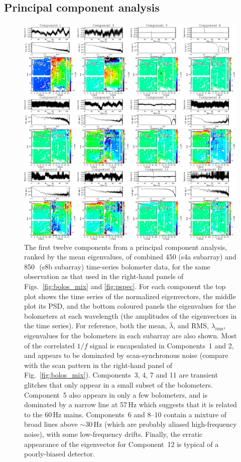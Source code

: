 \documentclass[useAMS,usenatbib,nofootinbib]{mn2e}
\newcommand{\rms}{RMS}
\begin{document}
\subsection{Principal component analysis}
\label{sec:pca}

\begin{figure}
\centering
\includegraphics[width=\linewidth]{pca.pdf}
\caption{The first twelve components from a principal component
  analysis, ranked by the mean eigenvalues, of combined 450 (s4a
  subarray) and 850\,\micron\ (s8b subarray) time-series bolometer
  data, for the same observation as that used in the right-hand panels
  of Figs.~\ref{fig:bolos_mix} and \ref{fig:pspec}. For each component
  the top plot shows the time series of the normalized eigenvectors,
  the middle plot its PSD, and the bottom coloured panels the
  eigenvalues for the bolometers at each wavelength (the amplitudes of
  the eigenvectors in the time series). For reference, both the mean,
  $\bar{\lambda}$, and \rms, $\lambda_\mathrm{rms}$, eigenvalues for
  the bolometers in each subarray are also shown. Most of the
  correlated $1/f$ signal is encapsulated in Components~1 and 2, and
  appears to be dominated by scan-synchronous noise (compare with the
  scan pattern in the right-hand panel of Fig.~\ref{fig:bolos_mix}).
  Components~3, 4, 7 and 11 are transient glitches that only appear in
  a small subset of the bolometers. Component~5 also appears in only a
  few bolometers, and is dominated by a narrow line at 57\,Hz which
  suggests that it is related to the 60\,Hz mains. Components~6 and
  8--10 contain a mixture of broad lines above $\sim$30\,Hz (which are
  probably aliased high-frequency noise), with some low-frequency
  drifts. Finally, the erratic appearance of the eigenvector for
  Component~12 is typical of a poorly-biased detector.}
\label{fig:pca}
\end{figure}
\end{document}
